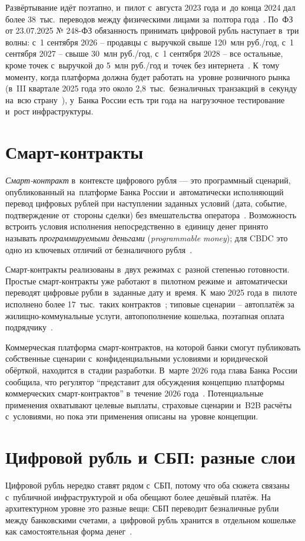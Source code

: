 Развёртывание идёт поэтапно, и~пилот с~августа 2023 года и~до
конца 2024 дал более 38~тыс.\ переводов между физическими лицами
за~полтора года~\cite{cbr-onrnps-2025}. По~ФЗ от 23.07.2025
№ 248-ФЗ обязанность принимать цифровой рубль наступает в~три волны:
с~1 сентября 2026 -- продавцы с~выручкой свыше 120~млн руб./год,
с~1 сентября 2027 -- свыше 30~млн руб./год, с~1 сентября 2028 --
все остальные, кроме точек с~выручкой до 5~млн руб./год и~точек
без интернета~\cite{fz-248}. К~тому моменту,
когда платформа должна будет работать на~уровне розничного рынка
(в~III квартале 2025 года это около 2,8~тыс.\ безналичных
транзакций в~секунду на~всю страну~\cite{cbr-payments-2025q3}),
у~Банка России есть три года на~нагрузочное тестирование и~рост
инфраструктуры.

\section{Смарт-контракты}\label{sec:cbdc-smart-contracts}

\emph{Смарт-контракт} в~контексте цифрового рубля --- это программный
сценарий, опубликованный на~платформе Банка России и~автоматически
исполняющий перевод цифровых рублей при наступлении заданных условий
(дата, событие, подтверждение от~стороны сделки) без вмешательства
оператора~\cite{cbr-digital-ruble}. Возможность встроить условия
исполнения непосредственно в~единицу денег принято называть
\emph{программируемыми деньгами} (\textit{programmable money}); для
CBDC это одно из ключевых отличий от безналичного
рубля~\cite{bis-wp880-cbdc-architectures}.

Смарт-контракты реализованы в~двух режимах с~разной степенью готовности.
Простые смарт-контракты уже работают в~пилотном режиме и~автоматически
переводят цифровые рубли в~заданные дату и~время.
К~маю 2025 года в~пилоте исполнено более 17~тыс.\ таких контрактов~\cite{cbr-digital-ruble}; типовые сценарии -- автоплатёж за
жилищно-коммунальные услуги, автопополнение кошелька, поэтапная оплата
подрядчику~\cite{gazprombank-smart-contracts-2025}.

Коммерческая платформа смарт-контрактов, на которой банки смогут
публиковать собственные сценарии с~конфиденциальными условиями и
юридической обёрткой, находится в~стадии разработки. В~марте 2026 года
глава Банка России сообщила, что регулятор \enquote{представит для
обсуждения концепцию платформы коммерческих смарт-контрактов} в~течение
2026 года~\cite{cbr-nabiullina-abr-2026}.
Потенциальные применения охватывают целевые выплаты, страховые
сценарии и~B2B расчёты с~условиями, но пока эти применения описаны
на~уровне концепции.

\section{Цифровой рубль и СБП: разные слои}\label{sec:cbdc-vs-sbp}

Цифровой рубль нередко ставят рядом с~СБП, потому что оба сюжета
связаны с~публичной инфраструктурой и оба обещают более дешёвый
платёж. На архитектурном уровне это разные вещи: СБП
переводит безналичные рубли между банковскими счетами, а~цифровой
рубль хранится в~отдельном кошельке как самостоятельная форма
денег~\cite{cbr-digital-ruble}.
